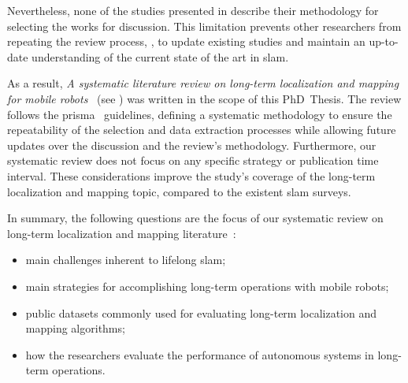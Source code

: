 Nevertheless, none of the studies presented in
 describe
their methodology for selecting the works for discussion.
This limitation prevents other researchers from repeating the review process,
\eg, to update existing studies and maintain an up-to-date understanding
of the current state of the art in \gls{slam}.

As a result, \textit{A systematic literature review on long-term localization
and mapping for mobile robots}~\cite{sousa:jfr:2023}
(see ) was written in the scope of
this PhD~Thesis. The review follows the \gls{prisma}~\cite{page:bmj:2021}
guidelines, defining a systematic methodology to ensure the repeatability of the
selection and data extraction processes while allowing future updates
over the discussion and the review's methodology.
Furthermore, our systematic review does not focus on any specific
strategy or publication time interval.
These considerations improve the study's coverage of
the long-term localization and mapping topic,
compared to the existent \gls{slam} surveys.

In summary, the following questions are the focus of our systematic review on
long-term localization and mapping literature~\cite{sousa:jfr:2023}:
\begin{itemize}
\item main challenges inherent to lifelong \gls{slam};
\item main strategies for accomplishing long-term operations with mobile robots;
\item public datasets commonly used for evaluating long-term localization and
mapping algorithms;
\item how the researchers evaluate the performance of autonomous systems in
long-term operations.
\end{itemize}

